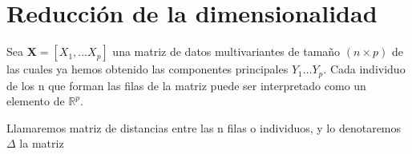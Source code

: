 \section{Reducción de la dimensionalidad}

\noindent Sea $\textbf{X}=[X_1,\ldots X_p]$ una matriz de datos multivariantes de tamaño $(n\times p)$ de las cuales ya hemos obtenido las componentes principales $Y_1 \ldots Y_p $. Cada individuo de los n que forman las filas de la matriz puede ser interpretado como un elemento de $\mathbb{R}^p$. 

\begin{defi}
Llamaremos matriz de distancias entre las n filas o individuos, y lo denotaremos $\Delta$ la matriz  
\end{defi}
